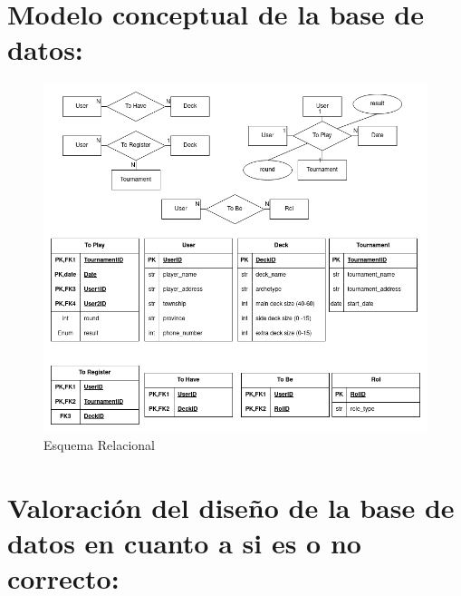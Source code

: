 \documentclass[a4paper]{article}
\begin{document}
\section{Modelo conceptual de la base de datos:}
\begin{figure}[h]
  \centering
  \includegraphics[width=1\textwidth]{design_with_roles.png}
  \caption{Esquema Relacional}
  \label{fig:etiqueta}
\end{figure}
\section{Valoraci\'on del dise\~no de la base de datos en cuanto a si es o no correcto:}
\end{document}
